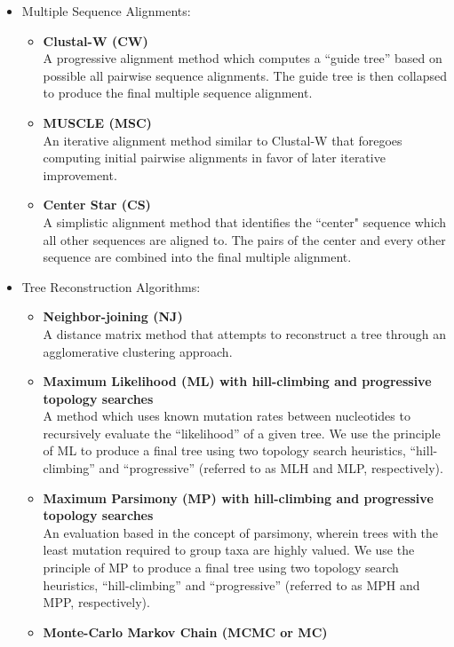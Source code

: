 \documentclass[10pt,twocolumn]{article}
\begin{document}
\begin{itemize}
\item Multiple Sequence Alignments:
  \begin{itemize}
    \item \textbf{Clustal-W (CW)}\\
      A progressive alignment method which computes a ``guide tree'' based on possible all pairwise
      sequence alignments. The guide tree is then collapsed to produce the final multiple sequence
      alignment.
    \item \textbf{MUSCLE (MSC)}\\
      An iterative alignment method similar to Clustal-W that foregoes computing initial
      pairwise alignments in favor of later iterative improvement. 
    \item \textbf{Center Star (CS)}\\
     A simplistic alignment method that identifies the ``center" sequence which all other sequences are aligned to. 
     The pairs of the center and every other sequence are combined into the final multiple alignment.
  \end{itemize}
\item Tree Reconstruction Algorithms:
  \begin{itemize}
    \item \textbf{Neighbor-joining (NJ)}\\
      A distance matrix method that attempts to reconstruct a tree through an agglomerative
      clustering approach.
    \item \textbf{Maximum Likelihood (ML) with hill-climbing and progressive topology searches}\\
      A method which uses known mutation rates between nucleotides to
      recursively evaluate the ``likelihood'' of a given tree. We use the principle
      of ML to produce a final tree using two topology search heuristics, ``hill-climbing''
      and ``progressive'' (referred to as MLH and MLP, respectively).
    \item \textbf{Maximum Parsimony (MP) with hill-climbing and progressive topology searches}\\
      An evaluation based in the concept of parsimony, wherein trees with the least
      mutation required to group taxa are highly valued. We use the principle
      of MP to produce a final tree using two topology search heuristics, ``hill-climbing''
      and ``progressive'' (referred to as MPH and MPP, respectively).
    \item \textbf{Monte-Carlo Markov Chain (MCMC or MC)}\\

\end{itemize}
\end{itemize}
\end{document}
